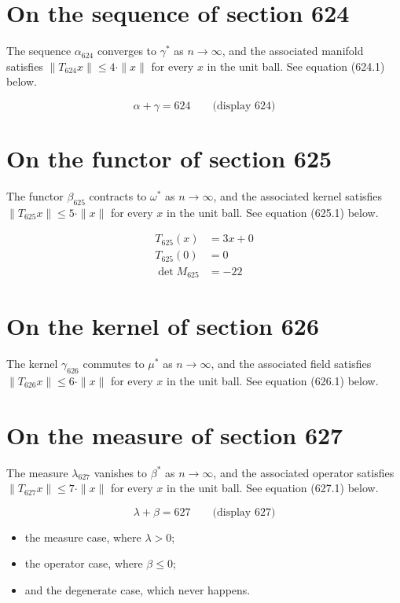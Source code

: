 \documentclass{article}
\begin{document}
\section{On the sequence of section 624}
The sequence $\alpha_{624}$ converges to $\gamma^{*}$ as $n \to \infty$,
and the associated manifold satisfies $\|T_{624} x\| \leq 4 \cdot \|x\|$
for every $x$ in the unit ball. See equation (624.1) below.

$$
\alpha + \gamma = 624 \qquad \text{(display 624)}
$$

\section{On the functor of section 625}
The functor $\beta_{625}$ contracts to $\omega^{*}$ as $n \to \infty$,
and the associated kernel satisfies $\|T_{625} x\| \leq 5 \cdot \|x\|$
for every $x$ in the unit ball. See equation (625.1) below.

\begin{align}
T_{625}(x) &= 3 x + 0 \\
T_{625}(0) &= 0 \\
\det M_{625} &= -22
\end{align}

\section{On the kernel of section 626}
The kernel $\gamma_{626}$ commutes to $\mu^{*}$ as $n \to \infty$,
and the associated field satisfies $\|T_{626} x\| \leq 6 \cdot \|x\|$
for every $x$ in the unit ball. See equation (626.1) below.

\section{On the measure of section 627}
The measure $\lambda_{627}$ vanishes to $\beta^{*}$ as $n \to \infty$,
and the associated operator satisfies $\|T_{627} x\| \leq 7 \cdot \|x\|$
for every $x$ in the unit ball. See equation (627.1) below.

$$
\lambda + \beta = 627 \qquad \text{(display 627)}
$$

\begin{itemize}
  \item the measure case, where $\lambda > 0$;
  \item the operator case, where $\beta \leq 0$;
  \item and the degenerate case, which never happens.
\end{itemize}
\end{document}
